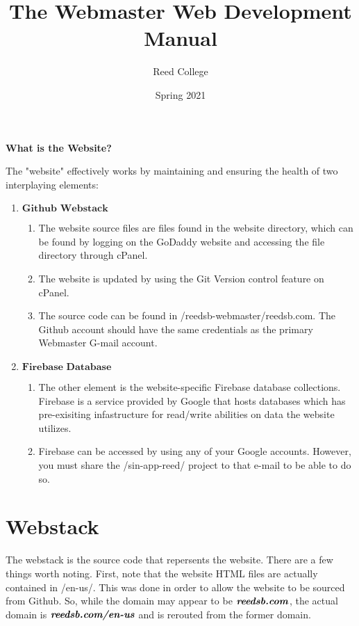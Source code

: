 \documentclass[a4paper]{article}
\title{The Webmaster Web Development Manual}
\author{Reed College}
\date{Spring 2021}
\begin{document}
\maketitle

\begin{center}
\textbf{What is the Website?}
\end{center}
The "website" effectively works by maintaining and ensuring the health of two interplaying elements:

\begin{enumerate}
  \item $\textbf{Github Webstack}$
    \begin{enumerate}
      \item The website source files are files found in the website directory, which can be found by logging on the GoDaddy website and accessing the file directory through cPanel.
      \item The website is updated by using the Git Version control feature on cPanel.
      \item The source code can be found in /reedsb-webmaster/reedsb.com. The Github account should have the same credentials as the primary Webmaster G-mail account.
    \end{enumerate}
  \item $\textbf{Firebase Database}$
    \begin{enumerate}
      \item The other element is the website-specific Firebase database collections. Firebase is a service provided by Google that hosts databases which has pre-exisiting infastructure for read/write abilities on data the website utilizes.
      \item Firebase can be accessed by using any of your Google accounts. However, you must share the /sin-app-reed/ project to that e-mail to be able to do so.
    \end{enumerate}
\end{enumerate}

\newpage
\section{Webstack}

The webstack is the source code that repersents the website. There are a few things worth noting. First, note that the website HTML files are actually contained in /en-us/. This was done in order to allow the website to be sourced from Github. So, while the domain may appear to be $\textbf{\textit{reedsb.com}}$, the actual domain is $\textbf{\textit{reedsb.com/en-us}}$ and is rerouted from the former domain.
\end{document}
